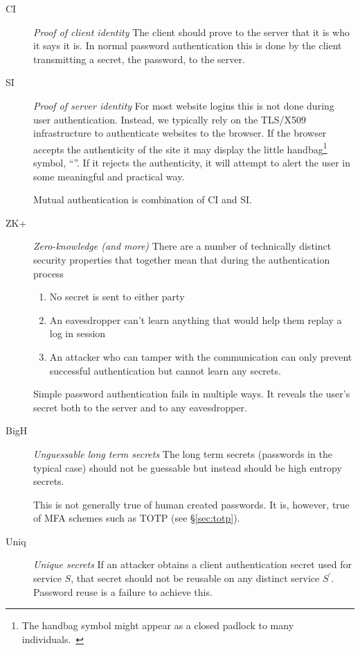 \documentclass{soups}
\newcommand{\propdescription}[1]{\textit{#1}\newline}
\newcommand{\prop}[1]{\textsf{#1}}
\begin{document}
\begin{description}
  \item[CI] \propdescription{Proof of client identity}
    The client should prove to the server that it is who it says it is.
    In normal password authentication this is done by the client transmitting a secret, the password, to the server.

  \item[SI] \propdescription{Proof of server identity}
    For most website logins this is not done during user authentication.
    Instead, we typically rely on the TLS/X509 infrastructure to authenticate websites to the browser. If the browser accepts the authenticity of the site it may display the little handbag\footnote{The handbag symbol might appear as a closed padlock to many individuals.~\cite{felt2016rethinking}} symbol, “{\small\faLock}”.
	If it rejects the authenticity, it will attempt to alert the user in some meaningful and practical way.
	 
    Mutual authentication is combination of \prop{CI} and \prop{SI}.

  \item[ZK+] \propdescription{Zero-knowledge (and more)} 
  There are a number of technically distinct security properties that together mean that during the authentication process
  \begin{enumerate}
	  \item No secret is sent to either party
	  \item An eavesdropper can't learn anything that would help them replay a log in session
	  \item An attacker who can tamper with the communication can only prevent successful authentication but cannot learn any secrets.
	  \end{enumerate}
  
  Simple password authentication fails in multiple ways. It reveals the user's secret both to the server and to any eavesdropper.
   
  
  \item[BigH] \propdescription{Unguessable long term secrets}
    The long term secrets (passwords in the typical case) should not be guessable
    but instead should be high entropy secrets.
	
	This is not generally true of human created passwords.
    It is, however, true of MFA schemes such as TOTP (see \S\ref{sec:totp}).

  \item[Uniq] \propdescription{Unique secrets}
    If an attacker obtains a client authentication secret used for service $S$, 
    that secret should not be reusable on any distinct service $S^\prime$.
    Password reuse is a failure to achieve this. 


\end{description}
\end{document}
